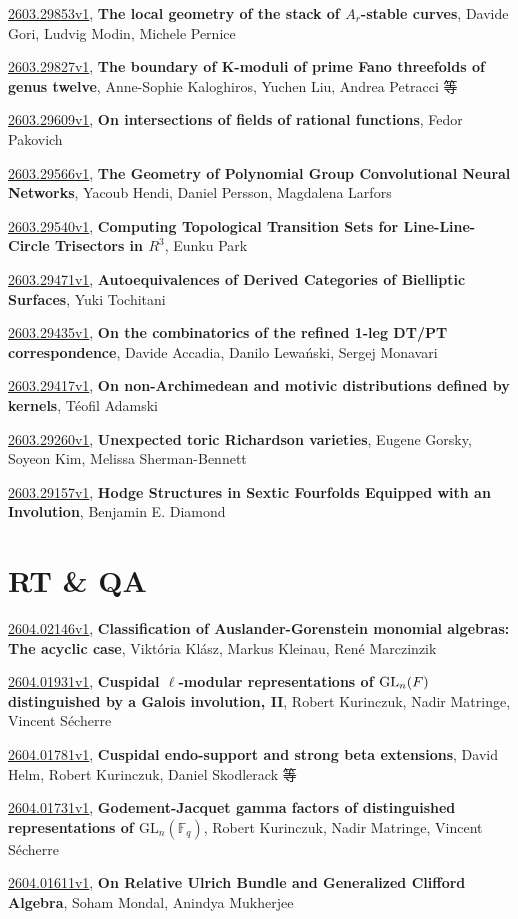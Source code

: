 \documentclass[9pt, a4paper]{article}
\theoremstyle{plain}
\theoremstyle{definition}
\theoremstyle{remark}
\newcommand{\arxiv}[3]{\href{https://arxiv.org/abs/#1}{#1}, \textbf{\textcolor{arxivblue}{#2}}, #3}
\begin{document}
\arxiv{2603.29853v1}{The local geometry of the stack of $A_r$-stable curves}{Davide Gori, Ludvig Modin, Michele Pernice}

\arxiv{2603.29827v1}{The boundary of K-moduli of prime Fano threefolds of genus twelve}{Anne-Sophie Kaloghiros, Yuchen Liu, Andrea Petracci 等}

\arxiv{2603.29609v1}{On intersections of fields of rational functions}{Fedor Pakovich}

\arxiv{2603.29566v1}{The Geometry of Polynomial Group Convolutional Neural Networks}{Yacoub Hendi, Daniel Persson, Magdalena Larfors}

\arxiv{2603.29540v1}{Computing Topological Transition Sets for Line-Line-Circle Trisectors in $R^3$}{Eunku Park}

\arxiv{2603.29471v1}{Autoequivalences of Derived Categories of Bielliptic Surfaces}{Yuki Tochitani}

\arxiv{2603.29435v1}{On the combinatorics of the refined 1-leg DT/PT correspondence}{Davide Accadia, Danilo Lewański, Sergej Monavari}

\arxiv{2603.29417v1}{On non-Archimedean and motivic distributions defined by kernels}{Téofil Adamski}

\arxiv{2603.29260v1}{Unexpected toric Richardson varieties}{Eugene Gorsky, Soyeon Kim, Melissa Sherman-Bennett}

\arxiv{2603.29157v1}{Hodge Structures in Sextic Fourfolds Equipped with an Involution}{Benjamin E. Diamond}


\section{RT \& QA}
\arxiv{2604.02146v1}{Classification of Auslander-Gorenstein monomial algebras: The acyclic case}{Viktória Klász, Markus Kleinau, René Marczinzik}

\arxiv{2604.01931v1}{Cuspidal $\ell$-modular representations of ${\rm GL}_n(F)$ distinguished by a Galois involution, II}{Robert Kurinczuk, Nadir Matringe, Vincent Sécherre}

\arxiv{2604.01781v1}{Cuspidal endo-support and strong beta extensions}{David Helm, Robert Kurinczuk, Daniel Skodlerack 等}

\arxiv{2604.01731v1}{Godement-Jacquet gamma factors of distinguished representations of $\mathrm{GL}_n(\mathbb{F}_q)$}{Robert Kurinczuk, Nadir Matringe, Vincent Sécherre}

\arxiv{2604.01611v1}{On Relative Ulrich Bundle and Generalized Clifford Algebra}{Soham Mondal, Anindya Mukherjee}
\end{document}
